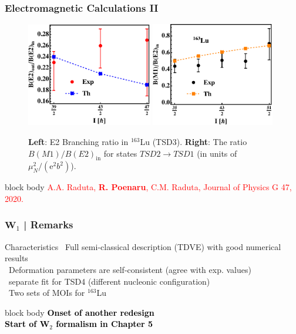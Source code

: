 \documentclass{beamer}
\begin{document}
\begin{frame}
	\frametitle{Electromagnetic Calculations II}
	\begin{figure}
		\centering
		\includegraphics[width=0.49\textwidth]{figures/BE2inout-3.pdf}
		\includegraphics[width=0.48\textwidth]{figures/BE2inout-4.pdf}
		\caption{\textbf{Left}: E2 Branching ratio in $^{163}$Lu (TSD3). \textbf{Right}: The ratio $B(M1)/B(E2)_\text{in}$ for states $TSD2 \to TSD1$ (in units of $\mu_N^2/(\mathrm{e}^2b^2)$).}
	\end{figure}
	\begin{beamercolorbox}[rounded=true,shadow=false, wd=\linewidth,]{block body}
		\centering
		\textcolor{red}{\footnotesize{A.A. Raduta, \textbf{R. Poenaru}, C.M. Raduta, Journal of Physics G 47, 2020.}}
	\end{beamercolorbox}
\end{frame}

\begin{frame}
	\frametitle{$\mathbf{W}_1$ | Remarks}
	\begin{exampleblock}{Characteristics}
		\faPlus\ Full semi-classical description (TDVE) with good numerical results\\
		\faPlus\ Deformation parameters are self-consistent (agree with exp. values)\\
		\faMinus\ separate fit for TSD4 (different nucleonic configuration)\\
		\faMinus\ Two sets of MOIs for $^{163}$Lu
	\end{exampleblock}
	\vspace{0.4cm}
	\begin{beamercolorbox}[rounded=true,shadow=false, wd=\linewidth,]{block body}
		\centering
		\textcolor{black}{\small{\textbf{Onset of another redesign}}}\\
		\textcolor{black}{\small{\textbf{Start of $\mathbf{W}_2$ formalism in Chapter 5}}}\\
	\end{beamercolorbox}
\end{frame}
\end{document}
